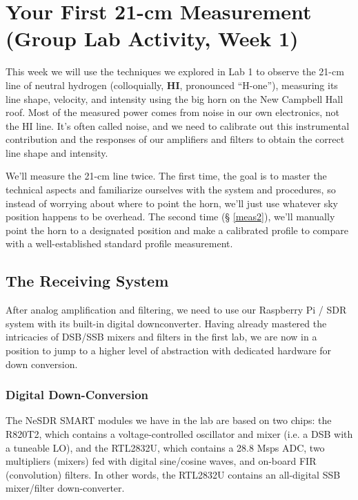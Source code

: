 \documentclass[11pt,preprint]{aastex}
\begin{document}
\section{Your First 21-cm Measurement (Group Lab Activity, Week 1)}
\label{radioastro}

\noindent
This week we will use the techniques we explored in Lab 1 to observe the
21-cm line of neutral hydrogen (colloquially, {\bf
  HI}, pronounced ``H-one''), measuring its line
shape, velocity, and intensity using the big horn on the New Campbell Hall roof.
Most of the measured power comes from noise in our own electronics, not the HI
line.  It's often called noise, and we need to calibrate out this
instrumental contribution and the responses of our amplifiers and filters to
obtain the correct line shape and intensity.

We'll measure the 21-cm line twice. The first time, the goal is to master
the technical aspects and familiarize ourselves with the system and
procedures, so instead of worrying about where to point the horn, we'll
just use whatever sky position happens to be overhead. The second time (\S
\ref{meas2}), we'll manually point the horn to a designated position and
make a calibrated profile to compare with a well-established standard
profile measurement.

\subsection{The Receiving System}

\noindent
After analog amplification and filtering, we need to use our
Raspberry Pi / SDR system with its built-in digital downconverter.
Having already mastered the intricacies of DSB/SSB mixers and filters in the
first lab, we are now in a position to jump to a higher level of 
abstraction with dedicated hardware for down conversion.

\subsubsection{Digital Down-Conversion}

\noindent
The NeSDR SMART modules we have in the lab are based on two chips:
the R820T2, which contains a voltage-controlled oscillator and mixer
(i.e. a DSB with a tuneable LO), and the RTL2832U, which contains
a 28.8 Msps ADC, two multipliers (mixers) fed with digital sine/cosine
waves, and on-board FIR (convolution) filters. 
In other words, the RTL2832U contains an all-digital SSB mixer/filter
down-converter.
\end{document}
